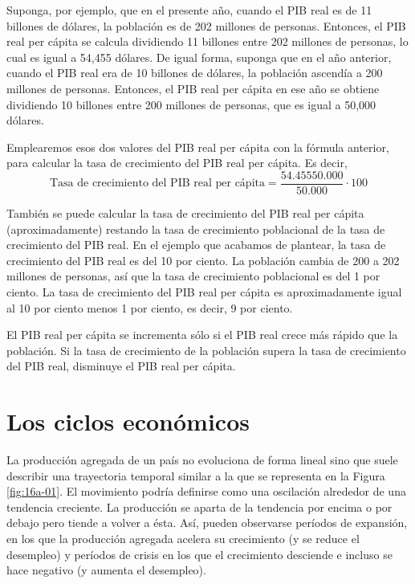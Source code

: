 \documentclass[
]{krantz}
\begin{document}
Suponga, por ejemplo, que en el presente año, cuando el PIB real es de 11 billones de dólares, la población es de 202 millones de personas. Entonces, el PIB real per cápita se calcula dividiendo 11 billones entre 202 millones de personas, lo cual es igual a 54,455 dólares. De igual forma, suponga que en el año anterior, cuando el PIB real era de 10 billones de dólares, la población ascendía a 200 millones de personas. Entonces, el PIB real per cápita en ese año se obtiene dividiendo 10 billones entre 200 millones de personas, que es igual a 50,000 dólares.

Emplearemos esos dos valores del PIB real per cápita con la fórmula anterior, para calcular la tasa de crecimiento del PIB real per cápita. Es decir,
\[\mathrm {\text{Tasa de crecimiento del PIB real per cápita} = \frac{54.455 50.000}{50.000}·100}\]

También se puede calcular la tasa de crecimiento del PIB real per cápita (aproximadamente) restando la tasa de crecimiento poblacional de la tasa de crecimiento del PIB real. En el ejemplo que acabamos de plantear, la tasa de crecimiento del PIB real es del 10 por ciento. La población cambia de 200 a 202 millones de personas, así que la tasa de crecimiento poblacional es del 1 por ciento. La tasa de crecimiento del PIB real per cápita es aproximadamente igual al 10 por ciento menos 1 por ciento, es decir, 9 por ciento.

El PIB real per cápita se incrementa sólo si el PIB real crece más rápido que la población. Si la tasa de crecimiento de la población supera la tasa de crecimiento del PIB real, disminuye el PIB real per cápita.

\hypertarget{los-ciclos-econuxf3micos}{%
\section{Los ciclos económicos}\label{los-ciclos-econuxf3micos}}

La producción agregada de un país no evoluciona de forma lineal sino que suele describir una trayectoria temporal similar a la que se representa en la Figura \ref{fig:16a-01}. El movimiento podría deﬁnirse como una oscilación alrededor de una tendencia creciente. La producción se aparta de la tendencia por encima o por debajo pero tiende a volver a ésta. Así, pueden observarse períodos de expansión, en los que la producción agregada acelera su crecimiento (y se reduce el desempleo) y períodos de crisis en los que el crecimiento desciende e incluso se hace negativo (y aumenta el desempleo).
\end{document}
